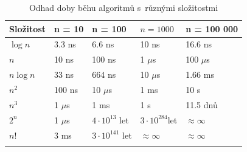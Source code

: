 \documentclass[12pt]{report}			%
\begin{document}
			\begin{table}[h]
			\centering
\begin{tabular}{lllll}
\hline
\multicolumn{1}{|r|}{Složitost} & \multicolumn{1}{l|}{n = 10}  & \multicolumn{1}{l|}{n = 100}                                                            & \multicolumn{1}{l|}{$n = 1000$}                & \multicolumn{1}{l|}{n = 100 000}        \\ \hline
\multicolumn{1}{|l|}{$\log n$}                             & \multicolumn{1}{l|}{3.3 ns}  & \multicolumn{1}{l|}{6.6 ns}                                                           & \multicolumn{1}{l|}{10 ns}                 & \multicolumn{1}{l|}{16.6 ns}          \\ \hline
\multicolumn{1}{|l|}{$n$}                                 & \multicolumn{1}{l|}{10 ns}   & \multicolumn{1}{l|}{100 ns}                                                           & \multicolumn{1}{l|}{1 $\mu$s}               & \multicolumn{1}{l|}{100 $\mu$s}        \\ \hline
\multicolumn{1}{|l|}{$n \log n$}                           & \multicolumn{1}{l|}{33 ns}   & \multicolumn{1}{l|}{664 ns}                                                           & \multicolumn{1}{l|}{10 $\mu$s}              & \multicolumn{1}{l|}{1.66 ms}          \\ \hline
\multicolumn{1}{|l|}{$n^2$}                             & \multicolumn{1}{l|}{100 ns}  & \multicolumn{1}{l|}{10 $\mu$s}                                                          & \multicolumn{1}{l|}{1 ms}                  & \multicolumn{1}{l|}{10 s}             \\ \hline
\multicolumn{1}{|l|}{$n^3$}                             & \multicolumn{1}{l|}{1 $\mu$s} & \multicolumn{1}{l|}{1 ms}                                                             & \multicolumn{1}{l|}{1 s}                   & \multicolumn{1}{l|}{11.5 dnů}         \\ \hline
\multicolumn{1}{|l|}{$2^n$}                             & \multicolumn{1}{l|}{1 $\mu$s} & \multicolumn{1}{l|}{$4 \cdot 10^{13}$ let} & \multicolumn{1}{l|}{$3 \cdot 10^{284}$let} & \multicolumn{1}{l|}{$\approx \infty$} \\ \hline
\multicolumn{1}{|l|}{$n!$}                                & \multicolumn{1}{l|}{3 ms}    & \multicolumn{1}{l|}{$3 \cdot 10^{141}$ let}                                           & \multicolumn{1}{l|}{$\approx\infty$}       & \multicolumn{1}{l|}{$\approx\infty$}  \\ \hline
                                                        &                              &                                                                                       &                                            &                                      
\end{tabular}
\caption{Odhad doby běhu algoritmů s~různými složitostmi}
\label{tabulka}
\end{table}
\end{document}
